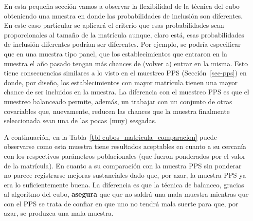\documentclass[
  spanish,
  a4paper,
]{scrreprt}
\begin{document}
En esta pequeña sección vamos a observar la flexibilidad de la técnica
del cubo obteniendo una muestra en donde las probabilidades de inclusión
son diferentes. En este caso particular se aplicará el criterio que esas
probabilidades sean proporcionales al tamaño de la matrícula aunque,
claro está, esas probabilidades de inclusión diferentes podrían ser
diferentes. Por ejemplo, se podría especificar que en una muestra tipo
panel, que los establecimientos que entraron en la muestra el año pasado
tengan más chances de (volver a) entrar en la misma. Esto tiene
consecuencias similares a lo visto en el muestreo PPS
(Sección~\ref{sec-pps}) en donde, por diseño, los establecimientos con
mayor matrícula tienen una mayor chance de ser incluidos en la muestra.
La diferencia con el muestreo PPS es que el muestreo balanceado permite,
además, un trabajar con un conjunto de otras covariables que,
nuevamente, reducen las chances que la muestra finalmente seleccionada
sean una de las pocas (muy) sesgadas.

A continuación, en la Tabla~\ref{tbl-cubos_matricula_comparacion} puede
observarse como esta muestra tiene resultados aceptables en cuanto a su
cercanía con los respectivos parámetros poblacionales (que fueron
ponderados por el valor de la matrícula). En cuanto a su comparación con
la muestra PPS sin ponderar no parece registrarse mejoras sustanciales
dado que, por azar, la muestra PPS ya era lo suficientemente buena. La
diferencia es que la técnica de balanceo, gracias al algoritmo del cubo,
\textbf{asegura} que que no saldrá una mala muestra mientras que con el
PPS se trata de confiar en que uno no tendrá mala suerte para que, por
azar, se produzca una mala muestra.
\end{document}
